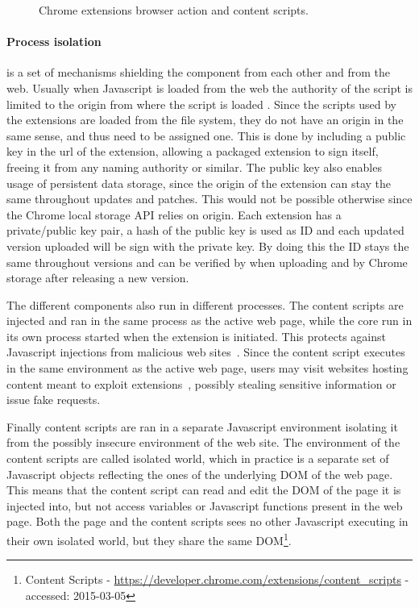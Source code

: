 \begin{figure}[ht]
    \caption{Chrome extensions browser action and content scripts.}
    \label{extension-ux}
\end{figure}

\paragraph{Process isolation} is a set of mechanisms shielding the component from each other and from the web. Usually when Javascript is loaded from the web the authority of the script is limited to the origin from where the script is loaded \cite{protecting-browsers}. Since the scripts used by the extensions are loaded from the file system, they do not have an origin in the same sense, and thus need to be assigned one. This is done by including a public key in the url of the extension, allowing a packaged extension to sign itself, freeing it from any naming authority or similar. The public key also enables usage of persistent data storage, since the origin of the extension can stay the same throughout updates and patches. This would not be possible otherwise since the Chrome local storage API relies on origin. Each extension has a private/public key pair, a hash of the public key is used as ID and each updated version uploaded will be sign with the private key. By doing this the ID stays the same throughout versions and can be verified by when uploading and by Chrome storage after releasing a new version. 


\par The different components also run in different processes. The content scripts are injected and ran in the same process as the active web page, while the core run in its own process started when the extension is initiated. This protects against Javascript injections from malicious web sites~\cite{javascript-injection}. Since the content script executes in the same environment as the active web page, users may visit websites hosting content meant to exploit extensions~\cite{carlini-chrome}, possibly stealing sensitive information or issue fake requests.
\par Finally content scripts are ran in a separate Javascript environment isolating it from the possibly insecure environment of the web site. The environment of the content scripts are called isolated world, which in practice is a separate set of Javascript objects reflecting the ones of the underlying DOM of the web page. This means that the content script can read and edit the DOM of the page it is injected into, but not access variables or Javascript functions present in the web page. Both the page and the content scripts sees no other Javascript executing in their own isolated world, but they share the same DOM\footnote{Content Scripts - \url{https://developer.chrome.com/extensions/content_scripts} - accessed: 2015-03-05}.


